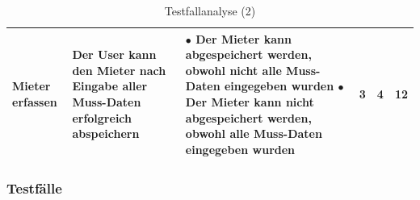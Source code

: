 \begin{table}[H]
\begin{tabulary}{1.0\textwidth}{|L|L|L|C|C|C|}
    \hline
    Mieter erfassen &  Der User kann den Mieter nach Eingabe aller Muss-Daten erfolgreich abspeichern & $\bullet$ Der Mieter kann abgespeichert werden, obwohl nicht alle Muss-Daten eingegeben wurden \newline $\bullet$ Der Mieter kann nicht abgespeichert werden, obwohl alle Muss-Daten eingegeben wurden & 3 & 4 &  12\\
    \hline
  \end{tabulary}
  \caption{Testfallanalyse (2)}
  \label{testanforderungen2}
\end{table}

\subsubsection{Testfälle}


